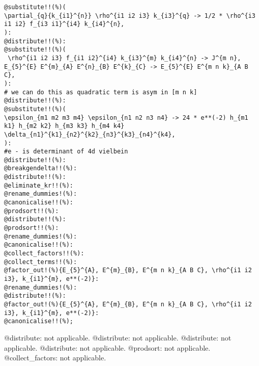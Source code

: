 \documentclass[11pt]{article}
\begin{document}
{\color[named]{Blue}\begin{verbatim}
@substitute!!(%)(
\partial_{q}{k_{i1}^{n}} \rho^{i1 i2 i3} k_{i3}^{q} -> 1/2 * \rho^{i3 i1 i2} f_{i3 i1}^{i4} k_{i4}^{n},
):
@distribute!!(%):
@substitute!!(%)(
 \rho^{i1 i2 i3} f_{i1 i2}^{i4} k_{i3}^{m} k_{i4}^{n} -> J^{m n},
E_{5}^{E} E^{m}_{A} E^{n}_{B} E^{k}_{C} -> E_{5}^{E} E^{m n k}_{A B C},
):
# we can do this as quadratic term is asym in [m n k]
@distribute!!(%):
@substitute!!(%)(
\epsilon_{m1 m2 m3 m4} \epsilon_{n1 n2 n3 n4} -> 24 * e**(-2) h_{m1 k1} h_{m2 k2} h_{m3 k3} h_{m4 k4} \delta_{n1}^{k1}_{n2}^{k2}_{n3}^{k3}_{n4}^{k4},
):
#e - is determinant of 4d vielbein
@distribute!!(%):
@breakgendelta!!(%):
@distribute!!(%):
@eliminate_kr!!(%):
@rename_dummies!(%):
@canonicalise!!(%):
@prodsort!!(%):
@distribute!!(%):
@prodsort!!(%):
@rename_dummies!(%):
@canonicalise!!(%):
@collect_factors!!(%):
@collect_terms!!(%):
@factor_out!(%){E_{5}^{A}, E^{m}_{B}, E^{m n k}_{A B C}, \rho^{i1 i2 i3}, k_{i1}^{m}, e**(-2)}:
@rename_dummies!(%):
@distribute!!(%):
@factor_out!(%){E_{5}^{A}, E^{m}_{B}, E^{m n k}_{A B C}, \rho^{i1 i2 i3}, k_{i1}^{m}, e**(-2)}:
@canonicalise!!(%);
\end{verbatim}}
@distribute: not applicable.
@distribute: not applicable.
@distribute: not applicable.
@distribute: not applicable.
@prodsort: not applicable.
@collect\_factors: not applicable.
\end{document}
